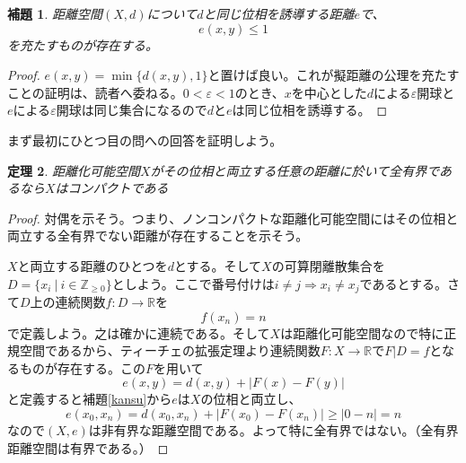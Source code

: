 \documentclass[leqno]{jsarticle}
\newtheorem{thm}{定理}
\newtheorem{lem}[thm]{補題}
\newcommand{\To}{\Longrightarrow}
\newcommand{\zz}{\mathbb{Z}}
\newcommand{\rr}{\mathbb{R}}
\newcommand{\ep}{\varepsilon}
\begin{document}
\begin{lem}\label{iti}
距離空間$(X,d)$について$d$と同じ位相を誘導する距離$e$で、
\[
e(x,y)\le1
\]
を充たすものが存在する。
\end{lem}
\begin{proof}
$e(x,y)=\min\{d(x,y),1\}$と置けば良い。これが擬距離の公理を充たすことの証明は、読者へ委ねる。$0<\ep<1$のとき、$x$を中心とした$d$による$\ep$開球と$e$による$\ep$開球は同じ集合になるので$d$と$e$は同じ位相を誘導する。
\end{proof}


まず最初にひとつ目の問への回答を証明しよう。
\begin{thm}
距離化可能空間$X$がその位相と両立する任意の距離に於いて全有界であるなら$X$はコンパクトである
\end{thm}
\begin{proof}
対偶を示そう。つまり、ノンコンパクトな距離化可能空間にはその位相と両立する全有界でない距離が存在することを示そう。\par
$X$と両立する距離のひとつを$d$とする。そして$X$の可算閉離散集合を$D=\{x_i\ |\ i\in \zz_{\ge 0}\}$としよう。ここで番号付けは$i\neq j\To x_i\neq x_j$であるとする。さて$D$上の連続関数$f:D\to \rr$を
\[
f(x_n)=n
\]
で定義しよう。之は確かに連続である。そして$X$は距離化可能空間なので特に正規空間であるから、ティーチェの拡張定理より連続関数$F:X\to \rr$で$F|D=f$となるものが存在する。この$F$を用いて
\[
e(x,y)=d(x,y)+|F(x)-F(y)|
\]
と定義すると補題\ref{kansu}から$e$は$X$の位相と両立し、
\[
e(x_0,x_n)=d(x_0,x_n)+|F(x_0)-F(x_n)|\ge |0-n|=n
\]
なので$(X,e)$は非有界な距離空間である。よって特に全有界ではない。（全有界距離空間は有界である。）
\end{proof}
\end{document}
